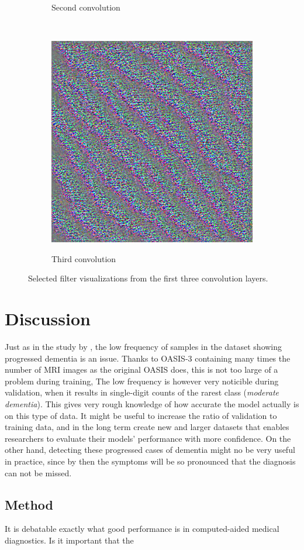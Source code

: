 \documentclass{kththesis}
\begin{document}
\begin{figure}
\begin{subfigure}{.5\textwidth}
    \label{fig:layer1}
    \caption{Second convolution}
  \end{subfigure}
  \\[10pt]
  \begin{subfigure}{1\textwidth}
    \centering
    \includegraphics[width=0.45\linewidth]{img/layer2.png}
    \label{fig:layer2}
    \caption{Third convolution}
  \end{subfigure}
  \label{fig:filtervis}
  \caption{Selected filter visualizations from the first three convolution layers.}
\end{figure}

\chapter{Discussion}
Just as in the study by \textcite{islam2018early}, the low frequency of samples in the dataset showing progressed dementia is an issue. Thanks to OASIS-3 containing many times the number of MRI images as the original OASIS does, this is not too large of a problem during training, The low frequency is however very noticible during validation, when it results in single-digit counts of the rarest class (\textit{moderate dementia}). This gives very rough knowledge of how accurate the model actually is on this type of data. It might be useful to increase the ratio of validation to training data, and in the long term create new and larger datasets that enables researchers to evaluate their models' performance with more confidence. On the other hand, detecting these progressed cases of dementia might no be very useful in practice, since by then the symptoms will be so pronounced that the diagnosis can not be missed.

\section{Method}
It is debatable exactly what good performance is in computed-aided medical diagnostics. Is it important that the 
\end{document}
